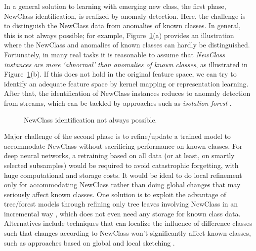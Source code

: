 \documentclass[review,11pt]{ReportTemplate}
\begin{document}
In a general solution \cite{Mu:Ting:Zhou2017} to learning with emerging new class, the first phase, NewClass identification, is realized by anomaly detection. Here, the challenge is to distinguish the NewClass data from anomalies of known classes. In general, this is not always possible; for example, Figure~\ref{fig:NewClass}(a) provides an illustration where the NewClass and anomalies of known classes can hardly be distinguished. Fortunately, in many real tasks it is reasonable to assume that \textit{NewClass instances are more `abnormal' than anomalies of known classes}, as illustrated in Figure~\ref{fig:NewClass}(b). If this does not hold in the original feature space, we can try to identify an adequate feature space by kernel mapping or representation learning. After that, the identification of NewClass instances reduces to anomaly detection from streams, which can be tackled by approaches such as \textit{isolation forest} \cite{Liu:Ting:Zhou:2008}.

\begin{figure}[!ht]
\begin{center}
  \caption{NewClass identification not always possible.}\label{fig:NewClass}
\end{center}
\end{figure}

Major challenge of the second phase is to refine/update a trained model to accommodate NewClass without sacrificing performance on known classes. For deep neural networks, a retraining based on all data (or at least, on smartly selected subsamples) would be required to avoid catastrophic forgetting, with huge computational and storage costs. It would be ideal to do local refinement only for accommodating NewClass rather than doing global changes that may seriously affect known classes. One solution is to exploit the advantage of tree/forest models through refining only tree leaves involving NewClass in an incremental way \cite{Mu:Ting:Zhou2017}, which does not even need any storage for known class data. Alternatives include techniques that can localize the influence of difference classes such that changes according to NewClass won't significantly affect known classes, such as approaches based on global and local sketching \cite{Mu:Zhu:Du:Lim:Zhou2017}.
\end{document}
